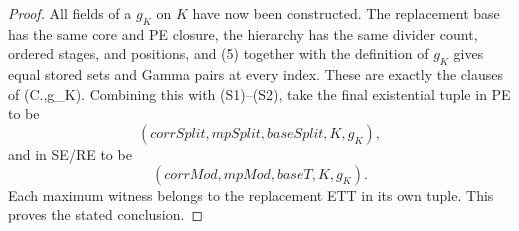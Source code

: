 \begin{proof}
All fields of a  \(g_K\) on \(K\) have now been
constructed.  The replacement base has the same core and PE closure,
the hierarchy has the same divider count, ordered stages, and positions,
and (5) together with the definition of \(g_K\) gives equal stored sets
and Gamma pairs at every index.  These are exactly the clauses of
(C.,g_K).  Combining this with
(S1)--(S2), take the final existential tuple in PE to be
\[
 (\mathit{corrSplit},\mathit{mpSplit},\mathit{baseSplit},K,g_K),
\]
and in SE/RE to be
\[
 (\mathit{corrMod},\mathit{mpMod},\mathit{baseT},K,g_K).
\]
Each maximum witness belongs to the replacement ETT in its own tuple.
This proves the stated conclusion.
\end{proof}
